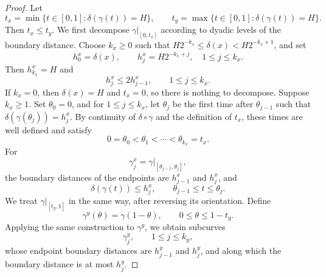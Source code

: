 \documentclass[11pt]{article}
\theoremstyle{definition}
\begin{document}
\begin{proof}
	Let
	\[
	t_x=\min\{t\in[0,1]:\delta(\gamma(t))=H\},
	\qquad
	t_y=\max\{t\in[0,1]:\delta(\gamma(t))=H\}.
	\]
	Then \(t_x\le t_y\).
	We first decompose \(\gamma|_{[0,t_x]}\) according to dyadic levels of
	the boundary distance.  Choose \(k_x\ge0\) such that
	\(H2^{-k_x}\le\delta(x)<H2^{-k_x+1}\),
	and set
	\[
	h_0^x=\delta(x),
	\qquad
	h_j^x=H2^{-k_x+j},
	\quad 1\le j\le k_x.
	\]
	Then \(h_{k_x}^x=H\) and
	\[
	h_j^x\le2h_{j-1}^x,
	\qquad 1\le j\le k_x.
	\]
	If \(k_x=0\), then \(\delta(x)=H\) and \(t_x=0\), so there is nothing
	to decompose.  Suppose \(k_x\ge1\).  Set \(\theta_0=0\), and for
	\(1\le j\le k_x\), let \(\theta_j\) be the first time after
	\(\theta_{j-1}\) such that
	\(\delta(\gamma(\theta_j))=h_j^x\).
	By continuity of \(\delta\circ\gamma\) and the definition of \(t_x\),
	these times are well defined and satisfy
	\[
	0=\theta_0<\theta_1<\cdots<\theta_{k_x}=t_x.
	\]
	For
	\[
	\gamma_j^x=\gamma|_{[\theta_{j-1},\theta_j]},
	\]
	the boundary distances of the endpoints are \(h_{j-1}^x\) and
	\(h_j^x\), and
	\[
	\delta(\gamma(t))\le h_j^x,
	\qquad
	\theta_{j-1}\le t\le\theta_j.
	\]
	We treat \(\gamma|_{[t_y,1]}\) in the same way, after reversing its
	orientation.  Define
	\[
	\gamma^y(\theta)=\gamma(1-\theta),
	\qquad
	0\le\theta\le1-t_y.
	\]
	Applying the same construction to \(\gamma^y\), we obtain subcurves
	\[
	\gamma_j^y,
	\qquad
	1\le j\le k_y,
	\]
	whose endpoint boundary distances are \(h_{j-1}^y\) and \(h_j^y\), and
	along which the boundary distance is at most \(h_j^y\).
	

\end{proof}
\end{document}

